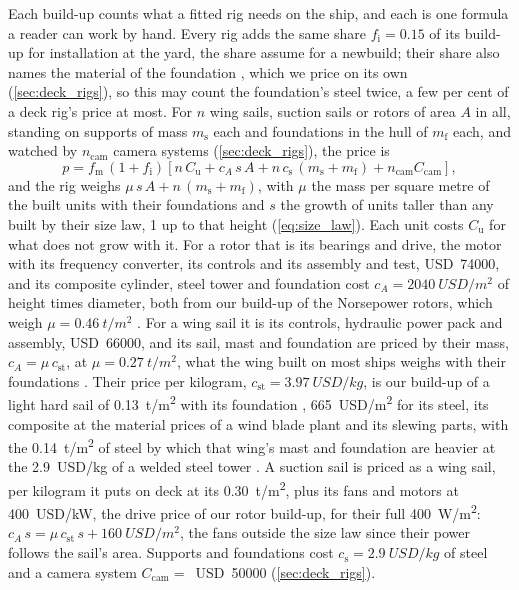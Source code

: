 Each build-up counts what a fitted rig needs on the ship, and each is one formula a reader can work by hand. Every rig adds the same share $f_\mathrm{i}=0.15$ of its build-up for installation at the yard, the share \citet[Table 7]{emsa2023} assume for a newbuild; their share also names the material of the foundation \citep[p.~41]{emsa2023}, which we price on its own (\cref{sec:deck_rigs}), so this may count the foundation's steel twice, a few per cent of a deck rig's price at most. For $n$ wing sails, suction sails or rotors of area $A$ in all, standing on supports of mass $m_\mathrm{s}$ each and foundations in the hull of $m_\mathrm{f}$ each, and watched by $n_\mathrm{cam}$ camera systems (\cref{sec:deck_rigs}), the price is
\begin{equation}
p = f_\mathrm{m}\,(1+f_\mathrm{i})\left[n\,C_\mathrm{u} + c_A\,s\,A + n\,c_\mathrm{s}\,(m_\mathrm{s} + m_\mathrm{f}) + n_\mathrm{cam} C_\mathrm{cam}\right],
\label{eq:deck_price}
\end{equation}
and the rig weighs $\mu\,s\,A + n\,(m_\mathrm{s} + m_\mathrm{f})$, with $\mu$ the mass per square metre of the built units with their foundations and $s$ the growth of units taller than any built by their size law, 1 up to that height (\cref{eq:size_law}). Each unit costs $C_\mathrm{u}$ for what does not grow with it. For a rotor that is its bearings and drive, the motor with its frequency converter, its controls and its assembly and test, USD~\num{74000}, and its composite cylinder, steel tower and foundation cost $c_A=\SI{2040}{USD/m^2}$ of height times diameter, both from our build-up of the Norsepower rotors, which weigh $\mu=\SI{0.46}{t/m^2}$ \citep[p.~3]{norsepower2025}. For a wing sail it is its controls, hydraulic power pack and assembly, USD~\num{66000}, and its sail, mast and foundation are priced by their mass, $c_A=\mu\,c_\mathrm{st}$, at $\mu=\SI{0.27}{t/m^2}$, what the wing built on most ships weighs with their foundations \citep{riviera2024windwing,oceanbird2026wing560}. Their price per kilogram, $c_\mathrm{st}=\SI{3.97}{USD/kg}$, is our build-up of a light hard sail of \SI{0.13}{t/m^2} with its foundation \citep[Table 4]{emsa2023}, \SI{665}{USD/m^2} for its steel, its composite at the material prices of a wind blade plant \citep{bortolotti2019blade} and its slewing parts, with the \SI{0.14}{t/m^2} of steel by which that wing's mast and foundation are heavier at the \SI{2.9}{USD/kg} of a welded steel tower \citep{wisdem_csm}. A suction sail is priced as a wing sail, per kilogram it puts on deck at its \SI{0.30}{t/m^2}, plus its fans and motors at \SI{400}{USD/kW}, the drive price of our rotor build-up, for their full \SI{400}{W/m^2}: $c_A\,s=\mu\,c_\mathrm{st}\,s + \SI{160}{USD/m^2}$, the fans outside the size law since their power follows the sail's area. Supports and foundations cost $c_\mathrm{s}=\SI{2.9}{USD/kg}$ of steel and a camera system $C_\mathrm{cam}=$~USD~\num{50000} (\cref{sec:deck_rigs}).

